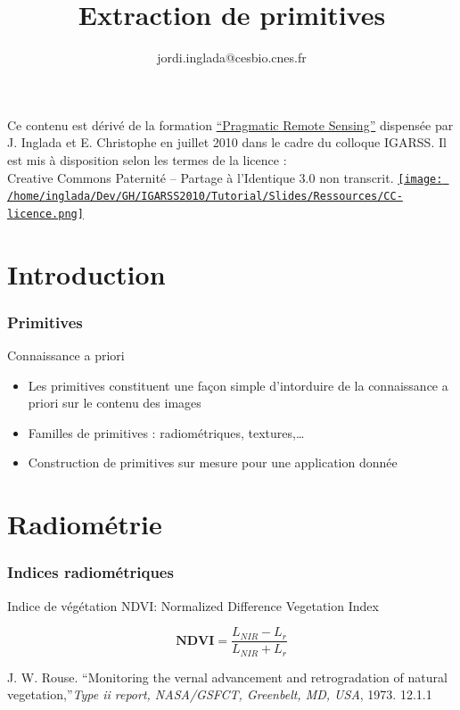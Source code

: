 \documentclass[compress]{beamer}
\title{Extraction de primitives}
\author
{jordi.inglada@cesbio.cnes.fr}
\institute[Cesbio] %
{\textsc{Centre d'Études Spatiales de la Biosphère, Toulouse, France}}
\date{}
\begin{document}
\begin{frame}
  \titlepage
  \begin{center}
{\tiny Ce contenu est dérivé de la formation \href{http://www.orfeo-toolbox.org/packages/PragmaticRemoteSensing-handout.pdf}{``Pragmatic Remote
  Sensing''} dispensée par J. Inglada et E. Christophe en juillet 2010
  dans le cadre du colloque IGARSS. Il est mis à disposition selon les termes de la licence :\\
Creative Commons Paternité – Partage à l’Identique 3.0 non transcrit.} \href{http://creativecommons.org/licenses/by-sa/3.0/}{\texttt{[image: /home/inglada/Dev/GH/IGARSS2010/Tutorial/Slides/Ressources/CC-licence.png]}}    
  \end{center}
\end{frame}

\section{Introduction}

\begin{frame}
\frametitle{Primitives}

\begin{block}{Connaissance a priori}
\begin{itemize}
\item Les primitives constituent une façon simple d'intorduire de la
  connaissance a priori sur le contenu des images
\item Familles de primitives : radiométriques, textures,\ldots
\item Construction de primitives sur mesure pour une application donnée
\end{itemize}
\end{block}

\end{frame}

\section{Radiométrie}

\begin{frame}
\frametitle{Indices radiométriques}
Indice de végétation NDVI: Normalized Difference Vegetation Index \cite{Rouse1973-NDVI}

\begin{equation}
 \mathbf{NDVI} = \frac{L_{NIR}-L_{r}}{L_{NIR}+L_{r}}
 \end{equation}

\begin{thebibliography}{noidea}
\footnotesize
{}
J. W. Rouse. ``Monitoring the vernal advancement and retrogradation of natural vegetation,''{\em Type ii report, NASA/GSFCT, Greenbelt, MD, USA}, 1973. 12.1.1
\end{thebibliography}

\end{frame}
\end{document}
